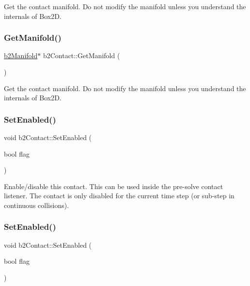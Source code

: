 Get the contact manifold. Do not modify the manifold unless you understand the internals of Box2D. \mbox{\label{classb2Contact_a3ed7faaf7a3999e6713714617e56e43f}} 
\subsubsection{\texorpdfstring{Get\+Manifold()}{GetManifold()}\hspace{0.1cm}{\footnotesize\ttfamily [2/2]}}
{\footnotesize\ttfamily \hyperlink{structb2Manifold}{b2\+Manifold}$\ast$ b2\+Contact\+::\+Get\+Manifold (\begin{DoxyParamCaption}{ }\end{DoxyParamCaption})}

Get the contact manifold. Do not modify the manifold unless you understand the internals of Box2D. \mbox{\label{classb2Contact_a6edf582f8c161d6632854cddefe55a0c}} 
\subsubsection{\texorpdfstring{Set\+Enabled()}{SetEnabled()}\hspace{0.1cm}{\footnotesize\ttfamily [1/2]}}
{\footnotesize\ttfamily void b2\+Contact\+::\+Set\+Enabled (\begin{DoxyParamCaption}\item[{bool}]{flag }\end{DoxyParamCaption})\hspace{0.3cm}{\ttfamily [inline]}}

Enable/disable this contact. This can be used inside the pre-\/solve contact listener. The contact is only disabled for the current time step (or sub-\/step in continuous collisions). \mbox{\label{classb2Contact_a6edf582f8c161d6632854cddefe55a0c}} 
\subsubsection{\texorpdfstring{Set\+Enabled()}{SetEnabled()}\hspace{0.1cm}{\footnotesize\ttfamily [2/2]}}
{\footnotesize\ttfamily void b2\+Contact\+::\+Set\+Enabled (\begin{DoxyParamCaption}\item[{bool}]{flag }\end{DoxyParamCaption})}

